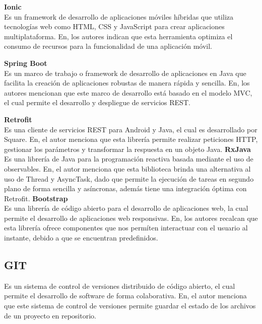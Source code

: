 \bigbreak
\textbf{Ionic} \\
Es un framework de desarrollo de aplicaciones móviles híbridas que utiliza tecnologías web como HTML, CSS y JavaScript para crear aplicaciones multiplataforma. En\cite{izaDesarrolloERPPara2023}, los autores indican que esta herramienta optimiza el consumo de recursos para la funcionalidad de una aplicación móvil.
\bigbreak

\textbf{Spring Boot} \\
Es un marco de trabajo o framework de desarrollo de aplicaciones en Java que facilita la creación de aplicaciones robustas de manera rápida y sencilla. En\cite{montalvoDesarrolloSistemaSoftware2023}, los autores mencionan que este marco de desarrollo está basado en el modelo MVC, el cual permite el desarrollo y despliegue de servicios REST.
\bigbreak

\textbf{Retrofit} \\
Es una cliente de servicios REST para Android y Java, el cual es desarrollado por Square.
En\cite{leonardoMejoraControlAsistencia2019}, el autor menciona que esta librería permite realizar peticiones HTTP, gestionar los parámetros y transformar la respuesta en un objeto Java.
\bigbreak
\textbf{RxJava} \\
Es una librería de Java para la programación reactiva basada mediante el uso de observables.
En\cite{leonardoMejoraControlAsistencia2019}, el autor menciona que esta biblioteca brinda una alternativa al uso de Thread y AsyncTask, dado que permite la ejecución de tareas en segundo plano de forma sencilla y asíncronas, además tiene una integración óptima con Retrofit.
\bigbreak
\textbf {Bootstrap} \\
Es una librería de código abierto para el desarrollo de aplicaciones web, la cual permite el desarrollo de aplicaciones web responsivas. En\cite{pintoSistemaGestionAdministrativo2017,ortegaPrototipoSistemaWeb2020}, los autores recalcan que esta librería ofrece componentes que nos permíten interactuar con el usuario al instante, debido a que se encuentran predefinidos.

\subsection{GIT}
Es un sistema de control de versiones distribuido de código abierto, el cual permite el desarrollo de software de forma colaborativa. En\cite{ortegaPrototipoSistemaWeb2020}, el autor menciona que este sistema de control de versiones permite guardar el estado de los archivos de un proyecto en repositorio.

